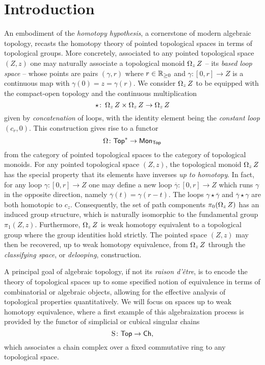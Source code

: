 
\section{Introduction}

An embodiment of the \textit{homotopy hypothesis}, a cornerstone of modern algebraic topology, recasts the homotopy theory of pointed topological spaces in terms of topological groups.
More concretely, associated to any pointed topological space $(Z,z)$ one may naturally associate a topological monoid $\operatorname{\Omega}_z Z$ -- its \textit{based loop space} -- whose points are pairs $(\gamma, r)$ where $r \in \mathbb{R}_{\geq 0}$ and $\gamma \colon [0,r] \to Z$ is a continuous map with $\gamma(0) = z = \gamma(r)$.
We consider $\operatorname{\Omega}_z Z$ to be equipped with the compact-open topology and the continuous multiplication
\[
\star \colon \operatorname{\Omega}_z Z \times \operatorname{\Omega}_z Z \to \operatorname{\Omega}_z Z
\]
given by \textit{concatenation} of loops, with the identity element being the \textit{constant loop} $(c_r,0)$.
This construction gives rise to a functor
\[
\operatorname{\Omega} \colon \mathsf{Top}^{\ast} \to \mathsf{Mon}_{\mathsf{Top}}
\]
from the category of pointed topological spaces to the category of topological monoids.
For any pointed topological space $(Z,z)$, the topological monoid $\operatorname{\Omega}_z Z$ has the special property that its elements have inverses \textit{up to homotopy}.
In fact, for any loop $\gamma \colon [0,r] \to Z $ one may define a new loop $\overline{\gamma} \colon [0,r] \to Z$ which runs $\gamma$ in the opposite direction, namely $\overline{\gamma}(t) = \gamma(r-t)$.
The loops $\gamma \star \overline{\gamma}$ and $\overline{\gamma} \star \gamma$ are both homotopic to $c_z$.
Consequently, the set of path components $\pi_0(\operatorname{\Omega}_z Z)$ has an induced group structure, which is naturally isomorphic to the fundamental group $\pi_1(Z,z)$.
Furthermore, $\operatorname{\Omega}_z Z$ is weak homotopy equivalent to a topological group where the group identities hold strictly.
The pointed space $(Z,z)$ may then be recovered, up to weak homotopy equivalence, from $\operatorname{\Omega}_z Z$ through the \textit{classifying space}, or \textit{delooping}, construction.

A principal goal of algebraic topology, if not its \textit{raison d'\^{e}tre}, is to encode the theory of topological spaces up to some specified notion of equivalence in terms of combinatorial or algebraic objects, allowing for the effective analysis of topological properties quantitatively.
We will focus on spaces up to weak homotopy equivalence, where a first example of this algebraization process is provided by the functor of simplicial or cubical singular chains
\[
\operatorname{S} \colon \mathsf{Top} \to \mathsf{Ch},
\]
which associates a chain complex over a fixed commutative ring to any topological space.

